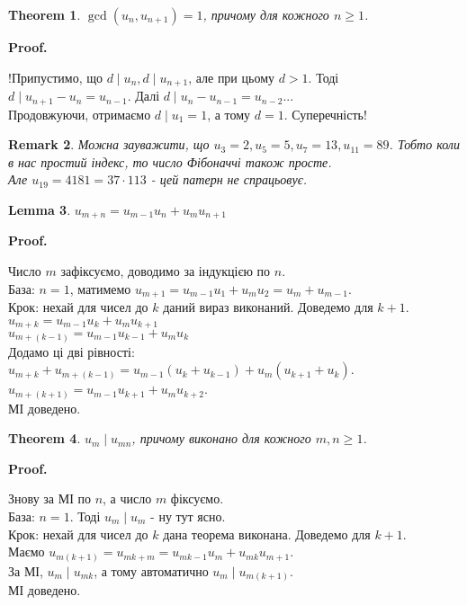\documentclass[a4paper, 14pt]{extarticle}
\makeatletter
\theoremstyle{theoremdd}
\newtheorem{theorem}{Theorem}[subsection]
\theoremstyle{theoremdd}
\theoremstyle{theoremdd}
\theoremstyle{theoremdd}
\theoremstyle{theoremdd}
\theoremstyle{theoremdd}
\newtheorem{remark}[theorem]{Remark}
\theoremstyle{theoremdd}
\newtheorem{lemma}[theorem]{Lemma}
\theoremstyle{theoremdd}
\def\qed{$\blacksquare$}
\renewenvironment{proof}[1][Proof.\\]{\par
\pushQED{\hfill \qed}%
\normalfont \topsep6\p@\@plus6\p@\relax
\trivlist
\item\relax
{\bfseries
#1\@addpunct{.}}\hspace\labelsep\ignorespaces
}{%
\popQED\endtrivlist\@endpefalse
}
\makeatother
\begin{document}
\begin{theorem}
$\gcd(u_n,u_{n+1}) = 1$, причому для кожного $n \geq 1$.
\end{theorem}

\begin{proof}
!Припустимо, що $d \mid u_n, d \mid u_{n+1}$, але при цьому $d > 1$. Тоді $d \mid u_{n+1}-u_n = u_{n-1}$. Далі $d \mid u_n - u_{n-1} = u_{n-2}$...\\
Продовжуючи, отримаємо $d \mid u_1 = 1$, а тому $d = 1$. Суперечність!
\end{proof}

\begin{remark}
Можна зауважити, що $u_3 = 2, u_5 = 5, u_7 = 13, u_{11} = 89$. Тобто коли в нас простий індекс, то число Фібоначчі також просте.\\
Але $u_{19} = 4181 = 37 \cdot 113$ - цей патерн не спрацьовує.
\end{remark}

\begin{lemma}
$u_{m+n} = u_{m-1}u_n + u_m u_{n+1}$
\end{lemma}

\begin{proof}
Число $m$ зафіксуємо, доводимо за індукцією по $n$.\\
База: $n=1$, матимемо $u_{m+1} = u_{m-1}u_1 + u_m u_2 = u_{m} + u_{m-1}$.\\
Крок: нехай для чисел до $k$ даний вираз виконаний. Доведемо для $k+1$.\\
$u_{m+k} = u_{m-1}u_k + u_m u_{k+1}$\\
$u_{m+(k-1)} = u_{m-1}u_{k-1} + u_mu_k$\\
Додамо ці дві рівності:\\
$u_{m+k}+u_{m+(k-1)} = u_{m-1}(u_k+u_{k-1})+u_m(u_{k+1}+u_k)$.\\
$u_{m+(k+1)} = u_{m-1}u_{k+1} + u_m u_{k+2}$.\\
МІ доведено.
\end{proof}

\begin{theorem}
$u_m \mid u_{mn}$, причому виконано для кожного $m,n \geq 1$.
\end{theorem}

\begin{proof}
Знову за МІ по $n$, а число $m$ фіксуємо.\\
База: $n =1$. Тоді $u_m \mid u_m$ - ну тут ясно.\\
Крок: нехай для чисел до $k$ дана теорема виконана. Доведемо для $k+1$.\\
Маємо $u_{m(k+1)} = u_{mk+m} = u_{mk-1}u_m + u_{mk}u_{m+1}$.\\
За МІ, $u_m \mid u_{mk}$, а тому автоматично $u_m \mid u_{m(k+1)}$.\\
МІ доведено.
\end{proof}
\end{document}
